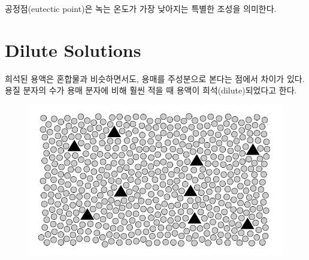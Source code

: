 \documentclass{article}
\begin{document}
공정점(eutectic point)은 녹는 온도가 가장 낮아지는 특별한 조성을 의미한다.

\newpage

\section{Dilute Solutions}

희석된 용액은 혼합물과 비슷하면서도, 용매를 주성분으로 본다는 점에서 차이가 있다. 용질 분자의 수가 용매 분자에 비해 훨씬 적을 때 용액이 희석(dilute)되었다고 한다. 

\begin{figure}[h]
    \centering
    \includegraphics[width=0.4\linewidth]{images/fig5_1.png}
\end{figure}
\end{document}
